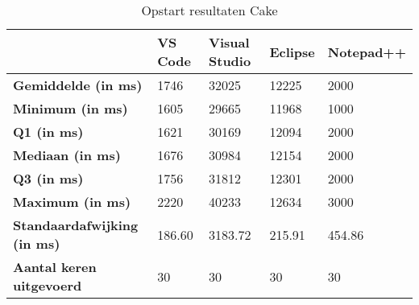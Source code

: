 \begin{table}[h!]
	\centering
	\begin{tabular}{ l l l l l }
		\hline
		                                    & \textbf{VS Code} & \textbf{Visual Studio} & \textbf{Eclipse} & \textbf{Notepad++} \\
		\hline
		\textbf{Gemiddelde (in ms)}         & 1746             & 32025                  & 12225            & 2000               \\[1ex]

		\textbf{Minimum (in ms) }           & 1605             & 29665                  & 11968            & 1000               \\
		\textbf{Q1 (in ms)}                 & 1621             & 30169                  & 12094            & 2000               \\
		\textbf{Mediaan (in ms)}            & 1676             & 30984                  & 12154            & 2000               \\
		\textbf{Q3 (in ms)}                 & 1756             & 31812                  & 12301            & 2000               \\
		\textbf{Maximum (in ms)}            & 2220             & 40233                  & 12634            & 3000               \\[1ex]

		\textbf{Standaardafwijking (in ms)} & 186.60           & 3183.72                & 215.91           & 454.86             \\
		\textbf{Aantal keren uitgevoerd}    & 30               & 30                     & 30               & 30                 \\
		\hline
	\end{tabular}
	\caption{Opstart resultaten Cake}
	\label{tab:resultatenStartupCake}
\end{table}

